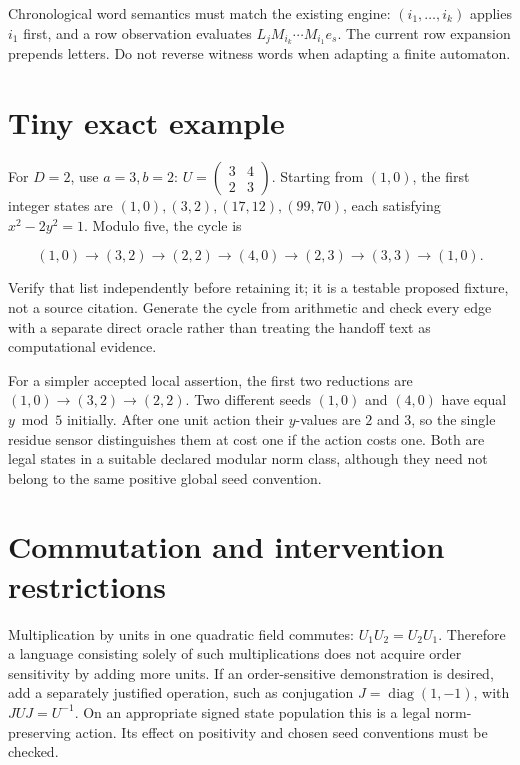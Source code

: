 \documentclass[
  11pt,
  a4paper,
]{report}
\begin{document}
Chronological word semantics must match the existing engine:
\((i_1,\ldots,i_k)\) applies \(i_1\) first, and a row observation
evaluates \(L_jM_{i_k}\cdots M_{i_1}e_s\). The current row expansion
prepends letters. Do not reverse witness words when adapting a finite
automaton.

\hypertarget{tiny-exact-example-1}{%
\section{Tiny exact example}\label{tiny-exact-example-1}}

For \(D=2\), use \(a=3,b=2\):
\(U=\begin{pmatrix}3&4\\2&3\end{pmatrix}\). Starting from \((1,0)\), the
first integer states are \((1,0),(3,2),(17,12),(99,70)\), each
satisfying \(x^2-2y^2=1\). Modulo five, the cycle is

\[
(1,0)\to(3,2)\to(2,2)\to(4,0)\to(2,3)\to(3,3)\to(1,0).
\]

Verify that list independently before retaining it; it is a testable
proposed fixture, not a source citation. Generate the cycle from
arithmetic and check every edge with a separate direct oracle rather
than treating the handoff text as computational evidence.

For a simpler accepted local assertion, the first two reductions are
\((1,0)\to(3,2)\to(2,2)\). Two different seeds \((1,0)\) and \((4,0)\)
have equal \(y\bmod5\) initially. After one unit action their
\(y\)-values are \(2\) and \(3\), so the single residue sensor
distinguishes them at cost one if the action costs one. Both are legal
states in a suitable declared modular norm class, although they need not
belong to the same positive global seed convention.

\hypertarget{commutation-and-intervention-restrictions}{%
\section{Commutation and intervention
restrictions}\label{commutation-and-intervention-restrictions}}

Multiplication by units in one quadratic field commutes:
\(U_1U_2=U_2U_1\). Therefore a language consisting solely of such
multiplications does not acquire order sensitivity by adding more units.
If an order-sensitive demonstration is desired, add a separately
justified operation, such as conjugation
\(J=\operatorname{diag}(1,-1)\), with \(JUJ=U^{-1}\). On an appropriate
signed state population this is a legal norm-preserving action. Its
effect on positivity and chosen seed conventions must be checked.
\end{document}
